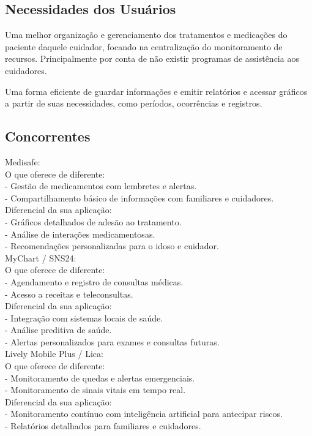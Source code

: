 \subsection*{Necessidades dos Usuários}
Uma melhor organização e gerenciamento dos tratamentos e medicações do paciente daquele cuidador, focando na centralização do monitoramento de recursos. Principalmente por conta de não existir programas de assistência aos cuidadores. 

Uma forma eficiente de guardar informações e emitir relatórios e acessar gráficos a partir de suas necessidades, como períodos, ocorrências e registros.

\subsection*{Concorrentes}
Medisafe:\\
 O que oferece de diferente: \\
- Gestão de medicamentos com lembretes e alertas. \\
- Compartilhamento básico de informações com familiares e cuidadores. \\
 Diferencial da sua aplicação: \\
-  Gráficos detalhados de adesão ao tratamento. \\
-  Análise de interações medicamentosas. \\
-  Recomendações personalizadas para o idoso e cuidador.\\

MyChart / SNS24:\\
 O que oferece de diferente: \\
- Agendamento e registro de consultas médicas.  \\
- Acesso a receitas e teleconsultas.\\
 Diferencial da sua aplicação: \\
-  Integração com sistemas locais de saúde.  \\
-  Análise preditiva de saúde.\\
-  Alertas personalizados para exames e consultas futuras. \\

Lively Mobile Plus / Lica:\\
 O que oferece de diferente:\\
-  Monitoramento de quedas e alertas emergenciais.\\
-  Monitoramento de sinais vitais em tempo real.\\
 Diferencial da sua aplicação:\\
-  Monitoramento contínuo com inteligência artificial para antecipar riscos.\\
-  Relatórios detalhados para familiares e cuidadores.\\

